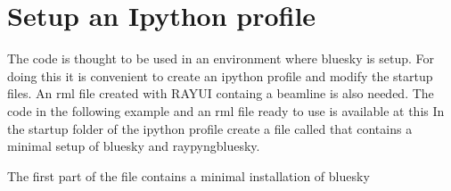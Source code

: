 \documentclass[letterpaper,10pt,english]{sphinxmanual}
\begin{document}
\section{Setup an Ipython profile}
\label{\detokenize{tutorial:setup-an-ipython-profile}}
\sphinxAtStartPar
The code is thought to be used in an environment where bluesky is setup. For doing this it is convenient to create an ipython profile
and modify the startup files. An rml file created with RAY\sphinxhyphen{}UI containg a beamline is also needed.
The code in the following example and an rml file ready to use is available at this 
In the startup folder of the ipython profile create a file called  that contains a minimal setup of bluesky and raypyng\sphinxhyphen{}bluesky.

\sphinxAtStartPar
The first part of the file contains a minimal installation of bluesky
\end{document}
